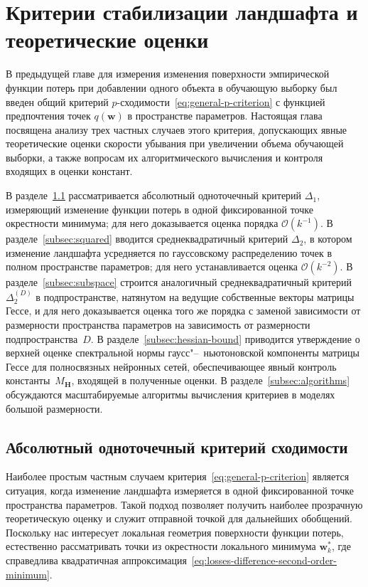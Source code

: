 \section{Критерии стабилизации ландшафта и теоретические оценки}\label{sec3}

В предыдущей главе для измерения изменения поверхности эмпирической функции потерь при добавлении одного объекта в обучающую выборку был введен общий критерий $p$-сходимости~\eqref{eq:general-p-criterion} с функцией предпочтения точек $q(\mathbf{w})$ в пространстве параметров. Настоящая глава посвящена анализу трех частных случаев этого критерия, допускающих явные теоретические оценки скорости убывания при увеличении объема обучающей выборки, а также вопросам их алгоритмического вычисления и контроля входящих в оценки констант.

В разделе~\ref{subsec:abs-onepoint} рассматривается абсолютный одноточечный критерий $\Delta_1$, измеряющий изменение функции потерь в одной фиксированной точке окрестности минимума; для него доказывается оценка порядка $\mathcal O(k^{-1})$. В разделе~\ref{subsec:squared} вводится среднеквадратичный критерий $\Delta_2$, в котором изменение ландшафта усредняется по гауссовскому распределению точек в полном пространстве параметров; для него устанавливается оценка $\mathcal O(k^{-2})$. В разделе~\ref{subsec:subspace} строится аналогичный среднеквадратичный критерий $\Delta_2^{(D)}$ в подпространстве, натянутом на ведущие собственные векторы матрицы Гессе, и для него доказывается оценка того же порядка с заменой зависимости от размерности пространства параметров на зависимость от размерности подпространства~$D$. В разделе~\ref{subsec:hessian-bound} приводится утверждение о верхней оценке спектральной нормы гаусс"--~ньютоновской компоненты матрицы Гессе для полносвязных нейронных сетей, обеспечивающее явный контроль константы~$M_{\mathbf H}$, входящей в полученные оценки. В разделе~\ref{subsec:algorithms} обсуждаются масштабируемые алгоритмы вычисления критериев в моделях большой размерности.

\subsection{Абсолютный одноточечный критерий сходимости}\label{subsec:abs-onepoint}

Наиболее простым частным случаем критерия~\eqref{eq:general-p-criterion} является ситуация, когда изменение ландшафта измеряется в одной фиксированной точке пространства параметров. Такой подход позволяет получить наиболее прозрачную теоретическую оценку и служит отправной точкой для дальнейших обобщений. Поскольку нас интересует локальная геометрия поверхности функции потерь, естественно рассматривать точки из окрестности локального минимума $\mathbf{w}_{k}^{*}$, где справедлива квадратичная аппроксимация~\eqref{eq:losses-difference-second-order-minimum}.

